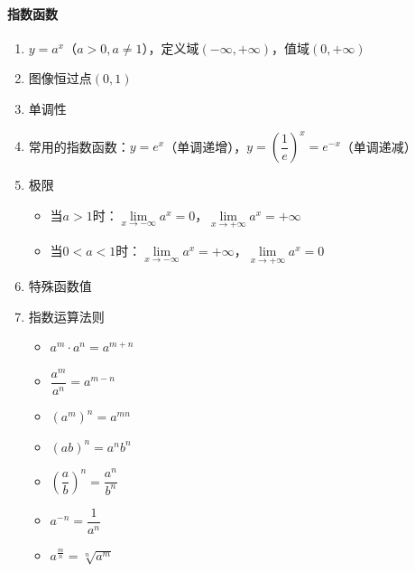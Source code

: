 \documentclass[../book.tex]{subfiles}
\begin{document}
    \paragraph{指数函数}
    \begin{enumerate}
        \item $y = a^x$（$a > 0, a \neq 1$），定义域$(-\infty, +\infty)$，值域$(0, +\infty)$
        \item 图像恒过点$(0, 1)$
        \item 单调性
        \item 常用的指数函数：$y = e^x$（单调递增），$y = \left(\dfrac{1}{e}\right)^x = e^{-x}$（单调递减）
        \item 极限
        \begin{itemize}
            \item 当$a > 1$时：$\lim\limits_{x \to -\infty} a^x = 0$，$\lim\limits_{x \to +\infty} a^x = +\infty$
            \item 当$0 < a < 1$时：$\lim\limits_{x \to -\infty} a^x = +\infty$，$\lim\limits_{x \to +\infty} a^x = 0$
        \end{itemize}
        \item 特殊函数值
        \item 指数运算法则
        \begin{itemize}
            \item $a^m \cdot a^n = a^{m+n}$
            \item $\dfrac{a^m}{a^n} = a^{m-n}$
            \item $(a^m)^n = a^{mn}$
            \item $(ab)^n = a^n b^n$
            \item $\left(\dfrac{a}{b}\right)^n = \dfrac{a^n}{b^n}$
            \item $a^{-n} = \dfrac{1}{a^n}$
            \item $a^{\frac{m}{n}} = \sqrt[n]{a^m}$
        \end{itemize}
    \end{enumerate}
\end{document}
